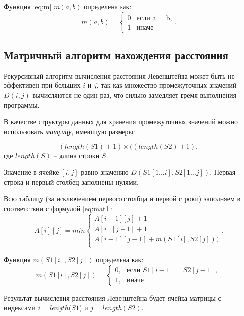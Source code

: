 Функция \ref{eq:m} $m(a, b)$ определена как:
\begin{equation}
	\label{eq:m}
	m(a, b) = \begin{cases}
		0 &\text{если a = b,}\\
		1 &\text{иначе}
	\end{cases}.
\end{equation}

\subsection{Матричный алгоритм нахождения расстояния}

Рекурсивный алгоритм вычисления расстояния Левенштейна может быть не эффективен при больших $i$ и $j$, так как множество промежуточных значений $D(i, j)$ вычисляются не один раз, что сильно замедляет время выполнения программы.

В качестве структуры данных для хранения промежуточных значений можно использовать \textit{матрицу}, имеющую  размеры:

\begin{equation}
	(length(S1)+ 1) \times ((length(S2) + 1),
\end{equation}
где $length(S)$ -- длина строки $S$

Значение в ячейке $[i, j]$ равно значению $D(S1[1...i], S2[1...j])$. Первая строка и первый столбец заполнены нулями.

Всю таблицу (за исключением первого столбца и первой строки) заполняем в соответствии с формулой \ref{eq:mat1}:
\begin{equation}
	\label{eq:mat1}
	A[i][j] = min \begin{cases}
		A[i-1][j] + 1\\
		 A[i][j-1] + 1\\
		 A[i-1][j-1] + m(S1[i], S2[j]))\\
	 \end{cases}.
 \end{equation}

Функция $m(S1[i], S2[j])$ определена как:
\begin{equation}
\label{eq:m2}
m(S1[i], S2[j]) = \begin{cases}
0, &\text{если $S1[i - 1] = S2[j - 1]$,}\\
1, &\text{иначе}
\end{cases}.
\end{equation}

Результат вычисления расстояния Левенштейна будет ячейка матрицы с индексами $i = length(S1$) и $j = length(S2)$.

